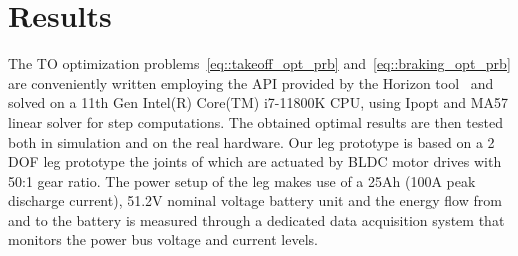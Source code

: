 \section{Results}\label{sec:exp_results}
The TO optimization problems~\eqref{eq::takeoff_opt_prb} and~\eqref{eq::braking_opt_prb} are conveniently written employing the API provided by the Horizon tool~\cite{to::horizon_to} and solved on a 11th Gen Intel(R) Core(TM) i7-11800K CPU, using Ipopt and MA57 linear solver for  step computations. 
The obtained optimal results are then tested both in simulation and on the real hardware.
Our leg prototype is based on a 2 DOF
leg prototype the joints of which are actuated by BLDC motor drives with 50:1 gear ratio. The power setup of the
leg makes use of a 25Ah (100A peak discharge current), 51.2V nominal voltage battery unit and the energy flow from and to the battery is measured through a dedicated data acquisition system that monitors the power bus voltage and current levels.
